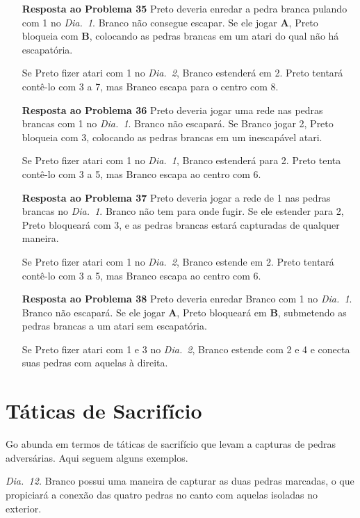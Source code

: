 \begin{itemize}
    \item[\textbf{Resposta ao Problema 35}] Preto deveria enredar a pedra branca pulando com 1 no \emph{Dia.\@~1}. Branco não consegue escapar. Se ele jogar \textbf{A}, Preto bloqueia com \textbf{B}, colocando as pedras brancas em um atari do qual não há escapatória.

        Se Preto fizer atari com 1 no \emph{Dia.\@~2}, Branco estenderá em 2. Preto tentará contê-lo com 3 a 7, mas Branco escapa para o centro com 8.
    \item[\textbf{Resposta ao Problema 36}] Preto deveria jogar uma rede nas pedras brancas com 1 no \emph{Dia.\@~1}. Branco não escapará. Se Branco jogar 2, Preto bloqueia com 3, colocando as pedras brancas em um inescapável atari.
    
        Se Preto fizer atari com 1 no \emph{Dia.\@~1}, Branco estenderá para 2. Preto tenta contê-lo com 3 a 5, mas Branco escapa ao centro com 6.
    \item[\textbf{Resposta ao Problema 37}] Preto deveria jogar a rede de 1 nas pedras brancas no \emph{Dia.\@~1}. Branco não tem para onde fugir. Se ele estender para 2, Preto bloqueará com 3, e as pedras brancas estará capturadas de qualquer maneira.
    
        Se Preto fizer atari com 1 no \emph{Dia.\@~2}, Branco estende em 2. Preto tentará contê-lo com 3 a 5, mas Branco escapa ao centro com 6.
    \item[\textbf{Resposta ao Problema 38}] Preto deveria enredar Branco com 1 no \emph{Dia.\@~1}. Branco não escapará. Se ele jogar \textbf{A}, Preto bloqueará em \textbf{B}, submetendo as pedras brancas a um atari sem escapatória.
    
        Se Preto fizer atari com 1 e 3 no \emph{Dia.\@~2}, Branco estende com 2 e 4 e conecta suas pedras com aquelas à direita.
\end{itemize}

\section{Táticas de Sacrifício}

Go abunda em termos de táticas de sacrifício que levam a capturas de pedras adversárias. Aqui seguem alguns exemplos.

\emph{Dia.\@~12.} Branco possui uma maneira de capturar as duas pedras marcadas, o que propiciará a conexão das quatro pedras no canto com aquelas isoladas no exterior.

